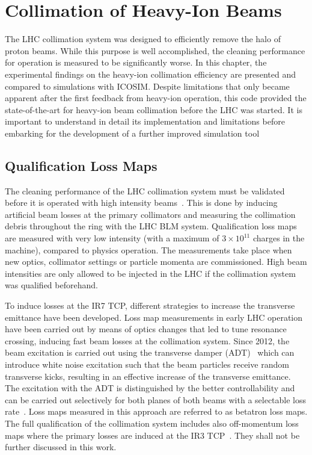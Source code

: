 \chapter{Collimation of Heavy-Ion Beams} \label{chap:collhi}


The LHC collimation system was designed to efficiently remove the halo of proton beams. While this purpose is well accomplished, the cleaning performance for \lead operation is measured to be significantly worse. In this chapter, the experimental findings on the heavy-ion collimation efficiency are presented and compared to simulations with ICOSIM. Despite limitations that only became apparent after the first feedback from heavy-ion operation, this code provided the state-of-the-art for heavy-ion beam collimation before the LHC was started. It is important to understand in detail its implementation and limitations before embarking for the development of a further improved simulation tool

\section{Qualification Loss Maps}\label{chap:qualification_lossmaps}

The cleaning performance of the LHC collimation system must be validated before it is operated with high intensity beams~\cite{EPAC06:TUPLS018}. This is done by inducing artificial beam losses at the primary collimators and measuring the collimation debris throughout the ring with the LHC BLM system. Qualification loss maps are measured with very low intensity (with a maximum of $3\times 10^{11}$ charges in the machine), compared to  physics operation. The measurements take place when new optics, collimator settings or particle momenta are commissioned. High beam intensities are only allowed to be injected in the LHC if the collimation system was qualified beforehand. 
\vspace{0.2cm}

To induce losses at the IR7 TCP, different strategies to increase the transverse emittance have been developed. Loss map measurements in early LHC operation have been carried out by means of optics changes that led to tune resonance crossing, inducing fast beam losses at the collimation system. Since 2012, the beam excitation is carried out using the transverse damper (\acrshort{ADT})~\cite{Moens:1574590} which can introduce white noise excitation such that the beam particles receive random transverse kicks, resulting in an effective increase of the transverse emittance. The excitation with the ADT is distinguished by the better controllability and can be carried out selectively for both planes of both beams with a selectable loss rate~\cite{Moens:1574590}. Loss maps measured in this approach are referred to as betatron loss maps. The full qualification of the collimation system includes also off-momentum loss maps where the primary losses are induced at the IR3 TCP~\cite{Moens:1574590}. They shall not be further discussed in this work.


